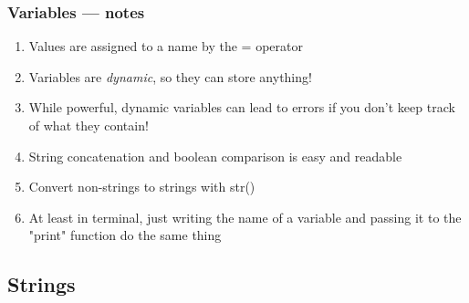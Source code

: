 \documentclass{beamer}\usepackage[]{graphicx}\usepackage[]{color}
\begin{document}
\begin{frame}
\frametitle{Variables --- notes}
	\begin{enumerate}

		\item Values are assigned to a name by the = operator

		\item Variables are \emph{dynamic}, so they can store anything!

		\item While powerful, dynamic variables can lead to errors if you don't keep track of what they contain!

		\item String concatenation and boolean comparison is easy and readable

		\item Convert non-strings to strings with str()

		\item At least in terminal, just writing the name of a variable and passing it to the "print" function do the same thing

	\end{enumerate}
\end{frame}

\subsection{Strings}
\end{document}
